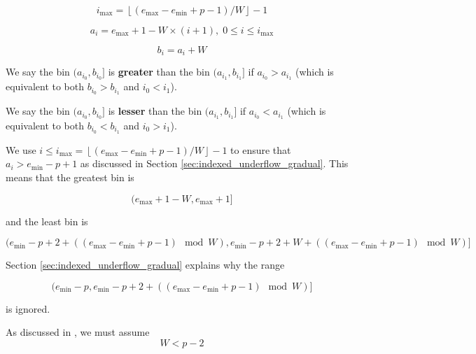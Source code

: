 \documentclass[12pt]{article}
\providecommand{\floor}[1]{\left \lfloor #1 \right \rfloor }
\providecommand{\min}{\ensuremath{\text{min}}}
\providecommand{\max}{\ensuremath{\text{max}}}
\theoremstyle{definition}
\numberwithin{equation}{section}
\numberwithin{figure}{section}
\begin{document}
    \begin{equation}
      i_{\max} = \floor{(e_{\max} - e_{\min} + p - 1)/W} - 1
      \label{eq:imax}
    \end{equation}

    \begin{equation}
      a_i = e_{\max} + 1 - W\times(i + 1),\; 0 \leq i \leq i_{\max}
      \label{eq:a}
    \end{equation}

    \begin{equation}
      b_i = a_i + W
      \label{eq:b}
    \end{equation}

    We say the bin $(a_{i_0}, b_{i_0}]$ is \textbf{greater} than the bin $(a_{i_1}, b_{i_1}]$ if $a_{i_0} > a_{i_1}$ (which is equivalent to both $b_{i_0} > b_{i_1}$ and $i_0 < i_1$).

    We say the bin $(a_{i_0}, b_{i_0}]$ is \textbf{lesser} than the bin $(a_{i_1}, b_{i_1}]$ if $a_{i_0} < a_{i_1}$ (which is equivalent to both $b_{i_0} < b_{i_1}$ and $i_0 > i_1$).

    We use $i \leq i_{\max} = \floor{(e_{\max} - e_{\min} + p - 1)/W} - 1$ to ensure that $a_i > e_{\min} - p + 1$ as discussed in Section \ref{sec:indexed_underflow_gradual}. This means that the greatest bin is

    \begin{equation}
      (e_{\max} + 1 - W, e_{\max} + 1]
      \label{eq:binmax}
    \end{equation}

    and the least bin is

    \begin{equation}
      (e_{\min} - p + 2 + ((e_{\max} - e_{\min} + p - 1)\mod W),
      e_{\min} - p + 2 + W + ((e_{\max} - e_{\min} + p - 1)\mod W)]
      \label{eq:binmin}
    \end{equation}

    Section \ref{sec:indexed_underflow_gradual} explains why the range

    \begin{equation*}
    (e_{\min} - p, e_{\min} - p + 2 + ((e_{\max} - e_{\min} + p - 1) \mod W)]
    \end{equation*}

    is ignored.

    As discussed in \cite{repsum}, we must assume
    \begin{equation}
      W < p - 2
      \label{eq:wupper}
    \end{equation}
\end{document}
